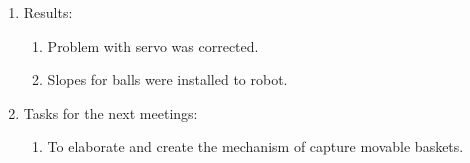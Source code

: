 \begin{enumerate}
	\item Results: 
	\begin{enumerate}
	  \item Problem with servo was corrected.
	  
      \item Slopes for balls were installed to robot.
      
    \end{enumerate}
    
	\item Tasks for the next meetings:
	\begin{enumerate}
	  \item To elaborate and create the mechanism of capture movable baskets.
	  
    \end{enumerate}     
\end{enumerate}
\fillpage
